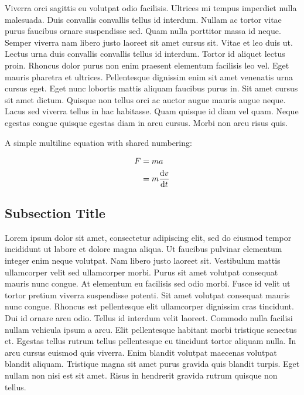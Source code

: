 \documentclass[10pt,letterpaper]{article}
\begin{document}
Viverra orci sagittis eu volutpat odio facilisis. Ultrices mi tempus imperdiet nulla malesuada. Duis convallis convallis tellus id interdum. Nullam ac tortor vitae purus faucibus ornare suspendisse sed. Quam nulla porttitor massa id neque. Semper viverra nam libero justo laoreet sit amet cursus sit. Vitae et leo duis ut. Lectus urna duis convallis convallis tellus id interdum. Tortor id aliquet lectus proin. Rhoncus dolor purus non enim praesent elementum facilisis leo vel. Eget mauris pharetra et ultrices. Pellentesque dignissim enim sit amet venenatis urna cursus eget. Eget nunc lobortis mattis aliquam faucibus purus in. Sit amet cursus sit amet dictum. Quisque non tellus orci ac auctor augue mauris augue neque. Lacus sed viverra tellus in hac habitasse. Quam quisque id diam vel quam. Neque egestas congue quisque egestas diam in arcu cursus. Morbi non arcu risus quis.\autocites[Lorem ipsum...][]{article-one}{article-two}

A simple multiline equation with shared numbering:

\begin{align}
  \begin{split}
    F &= ma \\
    &= m\dv{v}{t} \\
  \end{split}
\end{align}

\subsection{Subsection Title}

Lorem ipsum dolor sit amet, consectetur adipiscing elit, sed do eiusmod tempor incididunt ut labore et dolore magna aliqua. Ut faucibus pulvinar elementum integer enim neque volutpat. Nam libero justo laoreet sit. Vestibulum mattis ullamcorper velit sed ullamcorper morbi. Purus sit amet volutpat consequat mauris nunc congue. At elementum eu facilisis sed odio morbi. Fusce id velit ut tortor pretium viverra suspendisse potenti. Sit amet volutpat consequat mauris nunc congue. Rhoncus est pellentesque elit ullamcorper dignissim cras tincidunt. Dui id ornare arcu odio. Tellus id interdum velit laoreet. Commodo nulla facilisi nullam vehicula ipsum a arcu. Elit pellentesque habitant morbi tristique senectus et. Egestas tellus rutrum tellus pellentesque eu tincidunt tortor aliquam nulla. In arcu cursus euismod quis viverra. Enim blandit volutpat maecenas volutpat blandit aliquam. Tristique magna sit amet purus gravida quis blandit turpis. Eget nullam non nisi est sit amet. Risus in hendrerit gravida rutrum quisque non tellus.\autocite[Lorem ipsum...][]{book-two}
\end{document}
